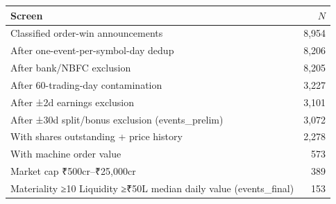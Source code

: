 \begin{tabular}{lr}
\toprule
Screen & $N$ \\
\midrule
Classified order-win announcements & 8,954 \\
After one-event-per-symbol-day dedup & 8,206 \\
After bank/NBFC exclusion & 8,205 \\
After 60-trading-day contamination & 3,227 \\
After ±2d earnings exclusion & 3,101 \\
After ±30d split/bonus exclusion (events_prelim) & 3,072 \\
With shares outstanding + price history & 2,278 \\
With machine order value & 573 \\
Market cap ₹500cr–₹25,000cr & 389 \\
Materiality ≥10%
Liquidity ≥₹50L median daily value (events_final) & 153 \\
\bottomrule
\end{tabular}